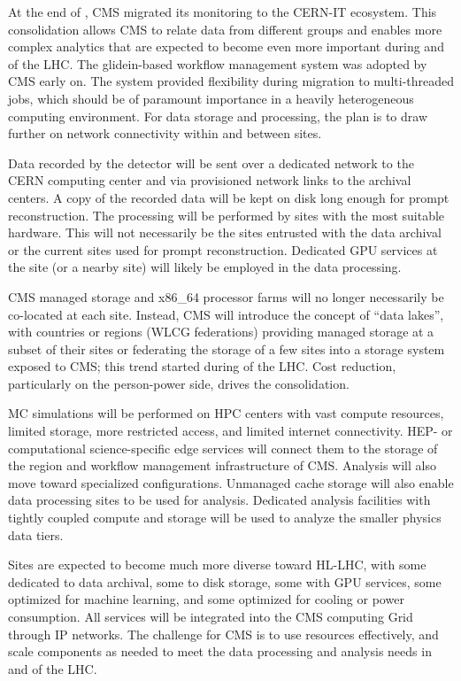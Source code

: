 At the end of \RunTwo, CMS migrated its monitoring to the CERN-IT ecosystem. This consolidation allows CMS to relate data from different groups and enables more complex analytics that are expected to become even more important during \RunFour and \RunFive of the LHC. The glidein-based workflow management system was adopted by CMS early on. The system provided flexibility during migration to multi-threaded jobs, which should be of paramount importance in a heavily heterogeneous computing environment. For data storage and processing, the plan is to draw further on network connectivity within and between sites.

Data recorded by the detector will be sent over a dedicated network to the CERN computing center and via provisioned network links to the archival centers. A copy of the recorded data will be kept on disk long enough for prompt reconstruction. The processing will be performed by sites with the most suitable hardware. This will not necessarily be the sites entrusted with the data archival or the current sites used for prompt reconstruction. Dedicated \gls{GPU} services at the site (or a nearby site) will likely be employed in the data processing.  

CMS managed storage and x86\_64 processor farms will no longer necessarily be co-located at each site. Instead, CMS will introduce the concept of ``data lakes'', with countries or regions (WLCG federations) providing managed storage at a subset of their sites or federating the storage of a few sites into a storage system exposed to CMS; this trend started during \RunThree of the LHC. Cost reduction, particularly on the person-power side, drives the consolidation. 

\gls{MC} simulations will be performed on \gls{HPC} centers with vast compute resources, limited storage, more restricted access, and limited internet connectivity. HEP- or computational science-specific edge services will connect them to the storage of the region and workflow management infrastructure of CMS. Analysis will also move toward specialized configurations. Unmanaged cache storage will also enable data processing sites to be used for analysis. Dedicated analysis facilities with tightly coupled compute and storage will be used to analyze the smaller physics data tiers.

Sites are expected to become much more diverse toward HL-LHC, with some dedicated to data archival, some to disk storage, some with \gls{GPU} services, some optimized for machine learning, and some optimized for cooling or power consumption. All services will be integrated into the CMS computing Grid through IP networks. The challenge for CMS is to use resources effectively, and scale components as needed to meet the data processing and analysis needs in \RunFour and \RunFive of the LHC.

